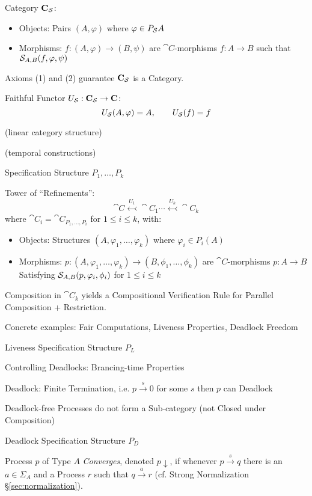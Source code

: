 Category $\mathbf{C}_{\mathcal{S}}$:
\begin{itemize}
  \item Objects: Pairs $(A,\varphi)$ where $\varphi \in P_{\mathcal{S}}A$
  \item Morphisms: $f : (A,\varphi) \rightarrow (B,\psi)$ are
    $\cat{C}$-morphisms $f : A \rightarrow B$ such that
    $\mathcal{S}_{A,B}(f,\varphi,\psi)$
\end{itemize}
Axioms (1) and (2) guarantee $\mathbf{C}_{\mathcal{S}}$ is a Category.

Faithful Functor $U_\mathcal{S} : \mathbf{C}_\mathcal{S} \rightarrow
\mathbf{C}$:
\[
  U_{\mathcal{S}}(A,\varphi) = A, \quad\quad U_{\mathcal{S}}(f) = f
\]

(linear category structure) %

(temporal constructions)

Specification Structure $P_1, \ldots, P_k$

Tower of ``Refinements'':
\[
  \cat{C} \stackrel{U_1}{\leftarrowtail} \cat{C}_1 \cdots
    \stackrel{U_k}{\leftarrowtail} \cat{C}_k
\]
where $\cat{C}_i = \cat{C}_{P_1, \ldots, P_i}$ for $1 \leq i \leq k$,
with:
\begin{itemize}
  \item Objects: Structures $(A, \varphi_1, \ldots, \varphi_k)$ where
    $\varphi_i \in P_i(A)$
  \item Morphisms: $p : (A, \varphi_1, \ldots, \varphi_k) \rightarrow
    (B, \phi_1, \ldots, \phi_k)$ are $\cat{C}$-morphisms $p : A
    \rightarrow B$ Satisfying $\mathcal{S}_{A,B}(p,\varphi_i,\phi_i)$
    for $1 \leq i \leq k$
\end{itemize}

Composition in $\cat{C}_k$ yields a Compositional Verification Rule
for Parallel Composition + Restriction.

Concrete examples: Fair Computations, Liveness Properties, Deadlock
Freedom %

Liveness Specification Structure $P_L$ %

Controlling Deadlocks: Brancing-time Properties %

Deadlock: Finite Termination, i.e. $p \xrightarrow{s} 0$ for some $s$
then $p$ can Deadlock

Deadlock-free Processes do not form a Sub-category (not Closed under
Composition)

Deadlock Specification Structure $P_D$ %

Process $p$ of Type $A$ \emph{Converges}, denoted $p\downarrow$, if
whenever $p \xrightarrow{s} q$ there is an $a \in \Sigma_A$ and a
Process $r$ such that $q \xrightarrow{a} r$ (cf. Strong Normalization
\S\ref{sec:normalization}).

